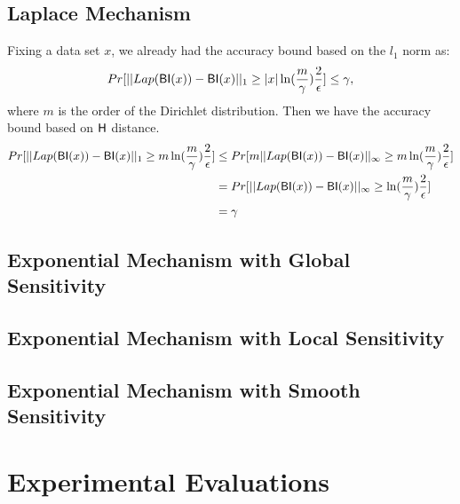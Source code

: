 \subsection{Laplace Mechanism}
Fixing a data set $x$, we already had the accuracy bound based on the $l_1$ norm as:
\begin{equation*}
Pr[||Lap(\mathsf{BI}(x)) - \mathsf{BI}(x)||_1 \geq |x| \ln (\frac{m}{\gamma}) \frac{2}{\epsilon}] \leq \gamma,
\end{equation*}
where $m$ is the order of the Dirichlet distribution. Then we have the accuracy bound based on $\mathsf{H}$ distance.
\begin{equation*}
\begin{split}
Pr[||Lap(\mathsf{BI}(x)) - \mathsf{BI}(x)||_1 \geq m \ln (\frac{m}{\gamma}) \frac{2}{\epsilon}] & \leq Pr[m ||Lap(\mathsf{BI}(x)) - \mathsf{BI}(x)||_{\infty} \geq m \ln (\frac{m}{\gamma}) \frac{2}{\epsilon}]\\
& = Pr[||Lap(\mathsf{BI}(x)) - \mathsf{BI}(x)||_{\infty} \geq \ln (\frac{m}{\gamma}) \frac{2}{\epsilon}]\\
& = \gamma
\end{split} 
\end{equation*}


\subsection{Exponential Mechanism with Global Sensitivity}


\subsection{Exponential Mechanism with Local Sensitivity}


\subsection{Exponential Mechanism with Smooth Sensitivity}


\section{Experimental Evaluations}
